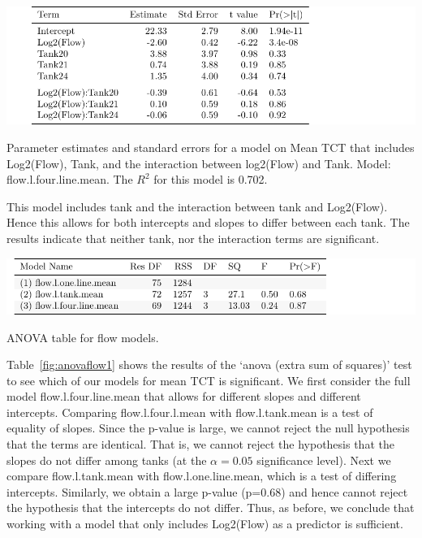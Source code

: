 \begin{table}[H]
\includegraphics{Chapter4Images/lfourlinemean.pdf}
\caption{Parameter estimates and standard errors for a model on Mean TCT that includes Log2(Flow), Tank, and the interaction between log2(Flow) and Tank. Model: flow.l.four.line.mean. The $R^{2}$ for this model is 0.702.}
\label{fig:meanflow3}
\end{table}

 This model includes tank and the interaction between tank and Log2(Flow). Hence this allows for both intercepts and slopes to differ between each tank. The results indicate that neither tank, nor the interaction terms are significant. 

\vspace{5mm}


\begin{table}[H]
\includegraphics{Chapter4Images/anovameanF.pdf}
\caption{ANOVA table for flow models.}
\label{fig:anovaflow1}
\end{table}


 Table~\ref{fig:anovaflow1} shows the results of the `anova (extra sum of squares)' test to see which of our models for mean TCT is significant. We first consider the full model  flow.l.four.line.mean that allows for different slopes and different intercepts. Comparing flow.l.four.l.mean with flow.l.tank.mean is a test of equality of slopes. Since the p-value is large, we cannot reject the null hypothesis that the terms are identical. That is, we cannot reject the hypothesis that the slopes do not differ among tanks (at the $\alpha=0.05$ significance level). Next we compare flow.l.tank.mean with flow.l.one.line.mean, which is a test of differing intercepts. Similarly, we obtain a large p-value (p=0.68) and hence cannot reject the hypothesis that the intercepts do not differ. Thus, as before, we conclude that working with a model that only includes Log2(Flow) as a predictor is sufficient.
















